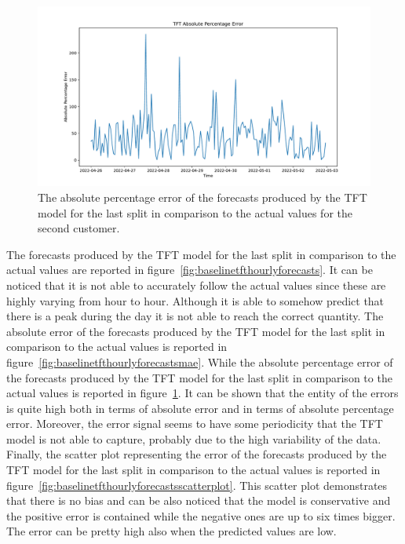 \begin{figure}[H]
\centering
\includegraphics[width=1\textwidth]{images/baseline/TFT_mape}
\caption{The absolute percentage error of the forecasts produced by the TFT model for the last split in comparison to the actual values for the second customer.}
\label{fig:baselinetfthourlyforecastsmape}
\end{figure}

The forecasts produced by the TFT model for the last split in comparison to the actual values are reported in figure~\ref{fig:baselinetfthourlyforecasts}.
It can be noticed that it is not able to accurately follow the actual values since these are highly varying from hour to hour.
Although it is able to somehow predict that there is a peak during the day it is not able to reach the correct quantity.
The absolute error of the forecasts produced by the TFT model for the last split in comparison to the actual values is reported in figure~\ref{fig:baselinetfthourlyforecastsmae}.
While the absolute percentage error of the forecasts produced by the TFT model for the last split in comparison to the actual values is reported in figure~\ref{fig:baselinetfthourlyforecastsmape}.
It can be shown that the entity of the errors is quite high both in terms of absolute error and in terms of absolute percentage error.
Moreover, the error signal seems to have some periodicity that the TFT model is not able to capture, probably due to the high variability of the data.
Finally, the scatter plot representing the error of the forecasts produced by the TFT model for the last split in comparison to the actual values is reported in figure~\ref{fig:baselinetfthourlyforecastsscatterplot}.
This scatter plot demonstrates that there is no bias and can be also noticed that the model is conservative and the positive error is contained while the negative ones are up to six times bigger.
The error can be pretty high also when the predicted values are low.

